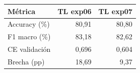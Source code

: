 \begin{tabular}{@{}lrr@{}}
\toprule
\textbf{Métrica} & \textbf{TL exp06} & \textbf{TL exp07} \\
\midrule
Accuracy (\%) & 80,91 & 80,80 \\
F1 macro (\%) & 83,18 & 82,62 \\
CE validación & 0,696 & 0,604 \\
Brecha (pp) & 18,69 & 9,37 \\
\bottomrule
\end{tabular}
